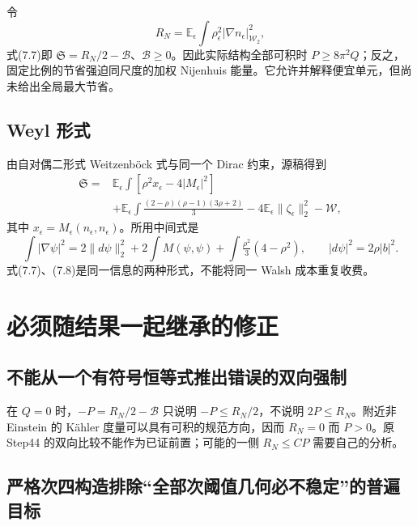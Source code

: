 \documentclass[UTF8,11pt,fontset=none]{ctexart}
\theoremstyle{definition}
\theoremstyle{remark}
\begin{document}
令 \[
 R_N=\mathbb E_\epsilon\int\rho_\epsilon^2
 |\nabla n_\epsilon|_{\mathcal W_2}^2,
\] 式(7.7)即 \(\mathfrak S=R_N/2-\mathcal B\)、\(\mathcal B\ge0\)。因此实际结构全部可积时 \(P\ge8\pi^2Q\)；反之，固定比例的节省强迫同尺度的加权 Nijenhuis 能量。它允许并解释便宜单元，但尚未给出全局最大节省。

\subsection{Weyl 形式}\label{v7-weyl-ux5f62ux5f0f}

由自对偶二形式 Weitzenböck 式与同一个 Dirac 约束，源稿得到 \[
 \begin{aligned}
 \mathfrak S={}&\mathbb E_\epsilon\int
 [\rho^2x_\epsilon-4|M_\epsilon|^2]\\
 &+\mathbb E_\epsilon\int
 \frac{(2-\rho)(\rho-1)(3\rho+2)}3
 -4\mathbb E_\epsilon\|\zeta_\epsilon\|_2^2-\mathcal W,
 \end{aligned}
\tag{7.8}
\] 其中 \(x_\epsilon=M_\epsilon(n_\epsilon,n_\epsilon)\)。所用中间式是 \[
 \int|\nabla\psi|^2
 =2\|d\psi\|_2^2+2\int M(\psi,\psi)
 +\int\tfrac{\rho^2}{3}(4-\rho^2),
 \qquad |d\psi|^2=2\rho|b|^2.
\] 式(7.7)、(7.8)是同一信息的两种形式，不能将同一 Walsh 成本重复收费。

\section{必须随结果一起继承的修正}\label{v7-ux5fc5ux987bux968fux7ed3ux679cux4e00ux8d77ux7ee7ux627fux7684ux4feeux6b63}

\subsection{不能从一个有符号恒等式推出错误的双向强制}\label{v7-ux4e0dux80fdux4eceux4e00ux4e2aux6709ux7b26ux53f7ux6052ux7b49ux5f0fux63a8ux51faux9519ux8befux7684ux53ccux5411ux5f3aux5236}

在 \(Q=0\) 时，\(-P=R_N/2-\mathcal B\) 只说明 \(-P\le R_N/2\)，不说明 \(2P\le R_N\)。附近非 Einstein 的 Kähler 度量可以具有可积的规范方向，因而 \(R_N=0\) 而 \(P>0\)。原 Step44 的双向比较不能作为已证前置；可能的一侧 \(R_N\le CP\) 需要自己的分析。\cite{B02}

\subsection{严格次四构造排除``全部次阈值几何必不稳定''的普遍目标}\label{v7-ux4e25ux683cux6b21ux56dbux6784ux9020ux6392ux9664ux5168ux90e8ux6b21ux9608ux503cux51e0ux4f55ux5fc5ux4e0dux7a33ux5b9aux7684ux666eux904dux76eeux6807}
\end{document}

